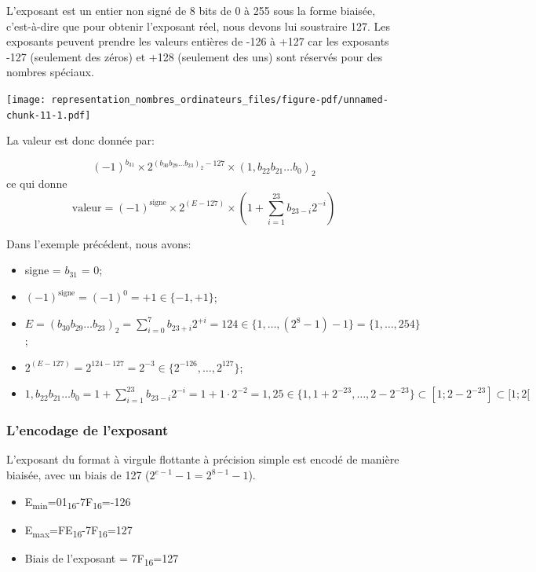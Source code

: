 \documentclass[
  letterpaper,
]{scrbook}
\providecommand{\tightlist}{%
  \setlength{\itemsep}{0pt}\setlength{\parskip}{0pt}}\usepackage{longtable,booktabs,array}
\theoremstyle{plain}
\theoremstyle{definition}
\theoremstyle{definition}
\theoremstyle{remark}
\begin{document}
L'exposant est un entier non signé de 8 bits de 0 à 255 sous la forme
biaisée, c'est-à-dire que pour obtenir l'exposant réel, nous devons lui
soustraire 127. Les exposants peuvent prendre les valeurs entières de
-126 à +127 car les exposants -127 (seulement des zéros) et +128
(seulement des uns) sont réservés pour des nombres spéciaux.

\texttt{[image: representation\_nombres\_ordinateurs\_files/figure-pdf/unnamed-chunk-11-1.pdf]}

La valeur est donc donnée par:

\[
(-1)^{b_{31}}\times 2^{(b_{30}b_{29}\ldots b_{23})_2-127}\times (1,b_{22}b_{21}\ldots b_0)_2
\] ce qui donne \[
\text{valeur}=(-1)^{\text{signe}}\times 2^{(E-127)}\times \left( 1+ \sum_{i=1}^{23} b_{23-i} 2^{-i}\right)
\]

Dans l'exemple précédent, nous avons:

\begin{itemize}
\tightlist
\item
  signe = \(b_{31}\) = 0;
\item
  \((-1)^{\text{signe}}=(-1)^0=+1\in \{-1,+1\}\);
\item
  \(E=(b_{30}b_{29}\ldots b_{23})_2=\sum_{i=0}^7 b_{23+i}2^{+i}=124\in \{1,\ldots, (2^8-1)-1\}=\{1,\ldots, 254\}\);
\item
  \(2^{(E-127)}=2^{124-127}=2^{-3}\in \{2^{-126},\ldots, 2^{127}\}\);
\item
  \(1,b_{22}b_{21}\ldots b_0=1+\sum_{i=1}^{23} b_{23-i}2^{-i}=1+1\cdot 2^{-2}=1,25\in \{1,1+2^{-23},\ldots, 2-2^{-23}\} \subset [1;2-2^{-23}] \subset [1;2[\)
\end{itemize}

\hypertarget{lencodage-de-lexposant}{%
\subsubsection*{L'encodage de l'exposant}\label{lencodage-de-lexposant}}

L'exposant du format à virgule flottante à précision simple est encodé
de manière biaisée, avec un biais de 127 (\(2^{e-1}-1=2^{8-1}-1\)).

\begin{itemize}
\tightlist
\item
  E\textsubscript{min}=01\textsubscript{16}-7F\textsubscript{16}=-126
\item
  E\textsubscript{max}=FE\textsubscript{16}-7F\textsubscript{16}=127
\item
  Biais de l'exposant = 7F\textsubscript{16}=127
\end{itemize}
\end{document}
